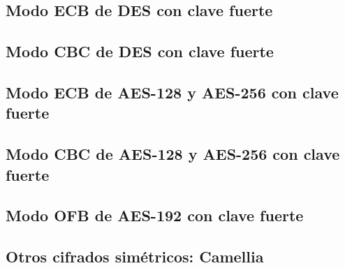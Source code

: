 \documentclass[a4paper, 11pt]{article}
\begin{document}
	\subsection{Modo ECB de DES con clave fuerte}
		
		
	\subsection{Modo CBC de DES con clave fuerte}
		
		
	\subsection{Modo ECB de AES-128 y AES-256 con clave fuerte}
		
		
	\subsection{Modo CBC de AES-128 y AES-256 con clave fuerte}
		
		
	\subsection{Modo OFB de AES-192 con clave fuerte}
		
		
	\subsection{Otros cifrados simétricos: Camellia}
		
	
\end{document}
